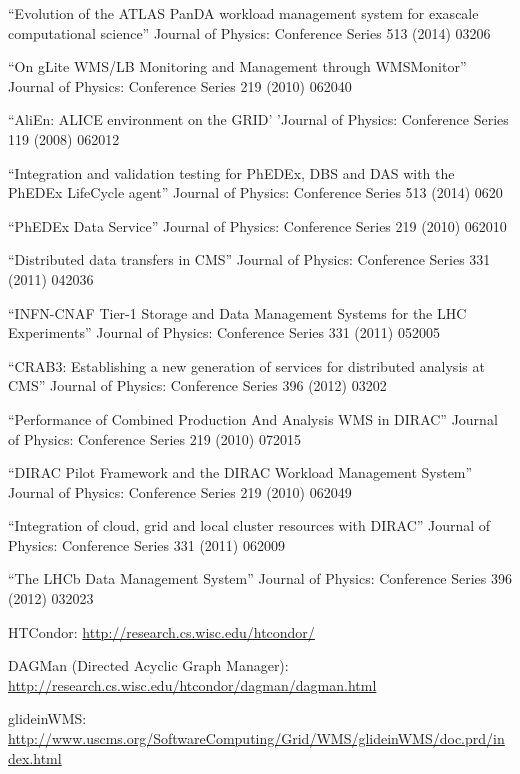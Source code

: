 \begin{thebibliography}{99}
 ``Evolution of the ATLAS PanDA workload management system for exascale computational science'' Journal of Physics: Conference Series 513 (2014) 03206

 ``On gLite WMS/LB Monitoring and Management through WMSMonitor'' Journal of Physics: Conference Series 219 (2010) 062040

 ``AliEn: ALICE environment on the GRID' 'Journal of Physics: Conference Series 119 (2008) 062012

 ``Integration and validation testing for PhEDEx, DBS and DAS with the PhEDEx LifeCycle agent'' Journal of Physics: Conference Series 513 (2014) 0620

 ``PhEDEx Data Service'' Journal of Physics: Conference Series 219 (2010) 062010

 ``Distributed data transfers in CMS'' Journal of Physics: Conference Series 331 (2011) 042036

 ``INFN-CNAF Tier-1 Storage and Data Management Systems for the LHC Experiments'' Journal of Physics: Conference Series 331 (2011) 052005

 ``CRAB3: Establishing a new generation of services for distributed analysis at CMS'' Journal of Physics: Conference Series 396 (2012) 03202

 ``Performance of Combined Production And Analysis WMS in DIRAC'' Journal of Physics: Conference Series 219 (2010) 072015

 ``DIRAC Pilot Framework and the DIRAC Workload Management System'' Journal of Physics: Conference Series 219 (2010) 062049

 ``Integration of cloud, grid and local cluster resources with DIRAC'' Journal of Physics: Conference Series 331 (2011) 062009

 ``The LHCb Data Management System'' Journal of Physics: Conference Series 396 (2012) 032023

 HTCondor: \url{http://research.cs.wisc.edu/htcondor/}

 DAGMan (Directed Acyclic Graph Manager): \url{http://research.cs.wisc.edu/htcondor/dagman/dagman.html}

 glideinWMS: \url{http://www.uscms.org/SoftwareComputing/Grid/WMS/glideinWMS/doc.prd/index.html}


\end{thebibliography}
